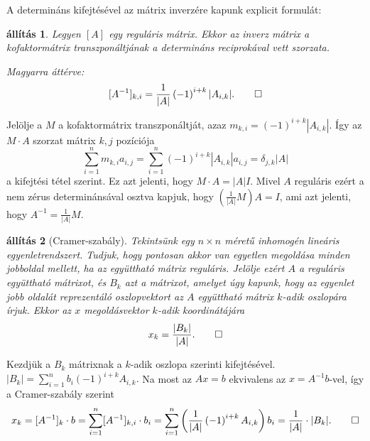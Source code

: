 \documentclass[9pt, a4paper, showtrims]{memoir}
\makeatletter
\renewenvironment{proof}[1][\proofname]
    {\par\pushQED{\qed}%
    \normalfont \topsep6\p@\@plus6\p@\relax
    \trivlist
    \item[\hskip\labelsep
        \itshape
    #1\@addpunct{:}]\ignorespaces}
    {\popQED\endtrivlist\@endpefalse}
\theoremstyle{plain}
\newtheorem{proposition}{állítás}[chapter]
\theoremstyle{remark}
\theoremstyle{definition}
\makeatother
\begin{document}
A determináns kifejtésével az mátrix inverzére kapunk explicit formulát:
\begin{proposition}
Legyen $[A]$ egy reguláris mátrix.
Ekkor az inverz mátrix a kofaktormátrix transzponáltjának a determináns reciprokával vett szorzata.

Magyarra áttérve:
\[
    [A^{-1}]_{k,i}=\frac{1}{|A|}\left( -1 \right)^{i+k}|A_{i,k}|.\qedhere
\]
\end{proposition}
\begin{proof}
    Jelölje a $M$ a kofaktormátrix transzponáltját,
    azaz $m_{k,i}=\left( -1 \right)^{i+k}|A_{i,k}|$.
    Így az $M\cdot A$ szorzat mátrix $k,j$ pozíciója
    \[
        \sum_{i=1}^nm_{k,i}a_{i,j}
        =
        \sum_{i=1}^n
            \left( -1 \right)^{i+k}|A_{i,k}|
            a_{i,j}
        =\delta_{j,k}|A|
    \]
    a kifejtési tétel szerint.
    Ez azt jelenti, hogy $M\cdot A=|A|I$.
    Mivel $A$ reguláris ezért a nem zérus determinánsával osztva kapjuk, hogy 
    $\left(\frac{1}{|A|}M\right)A=I$,
    ami azt jelenti, hogy $A^{-1}=\frac{1}{|A|}M$.
\end{proof}
\begin{proposition}[Cramer-szabály]
        Tekintsünk egy $n\times n$ méretű inhomogén lineáris egyenletrendszert.
        Tudjuk, hogy pontosan akkor van egyetlen megoldása minden jobboldal mellett, 
        ha az együttható mátrix reguláris.
        Jelölje  ezért $A$ a reguláris együttható mátrixot, 
        és $B_k$ azt a mátrixot, amelyet úgy kapunk, 
        hogy az egyenlet jobb oldalát reprezentáló oszlopvektort az $A$ együttható mátrix $k$-adik 
        oszlopára írjuk.
        Ekkor az $x$ megoldásvektor $k$-adik koordinátájára
        \[
            x_k=\frac{|B_k|}{|A|}.\qedhere
        \]
\end{proposition}
\begin{proof}
    Kezdjük a $B_k$ mátrixnak a $k$-adik oszlopa szerinti kifejtésével.
    \(
        |B_k|
        =
        \sum_{i=1}^nb_i\left( -1 \right)^{i+k}A_{i,k}.
    \)
    Na most az $Ax=b$ ekvivalens az $x=A^{-1}b$-vel,
    így a Cramer-szabály szerint
    \[
        x_k=[A^{-1}]_k\cdot b
        =
        \sum_{i=1}^n[A^{-1}]_{k,i}\cdot b_i
        =
        \sum_{i=1}^n\left( \frac{1}{|A|}\left( -1 \right)^{i+k}A_{i,k} \right)b_i
        =
        \frac{1}{|A|}\cdot |B_k|.\qedhere
    \]
\end{proof}
\end{document}
